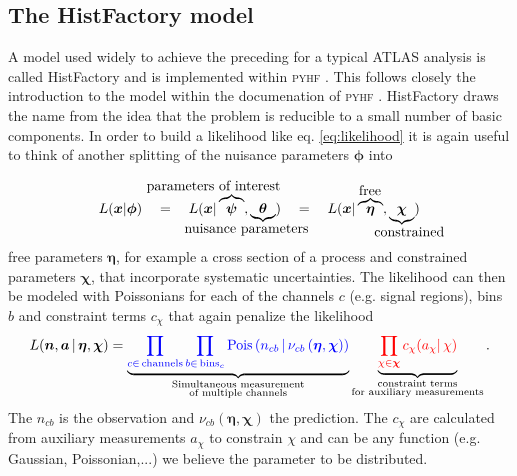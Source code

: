 \subsection{The HistFactory model}

A model used widely to achieve the preceding for a typical ATLAS analysis is called HistFactory \citep{cranmer2012histfactory} and is implemented within \textsc{pyhf} \citep{heinrich2021pyhf}. This follows closely the introduction to the model within the documenation of \textsc{pyhf} \citep{pyhf_intro}. HistFactory draws the name from the idea that the problem is reducible to a small number of basic components. In order to build a likelihood like eq. \ref{eq:likelihood} it is again useful to think of another splitting of the nuisance parameters $\bm{\phi}$ into

\newcommand{\freeset}{\bm{\eta}}
\newcommand{\constrset}{\bm{\chi}}
\newcommand{\singleconstr}{\chi}
\newcommand{\channelcounts}{\bm{n}}
\newcommand{\auxdata}{\bm{a}}
\newcommand{\poiset}{\bm{\psi}}
\newcommand{\nuisset}{\bm{\theta}}
\newcommand{\fullset}{\bm{\phi}}
\newcommand{\singlefull}{\phi}


\begin{equation}
 L(\bm{x}|\fullset) \quad=\quad
 L(\bm{x}|\overbrace{\poiset}^{\llap{\text{parameters of interest}}},\underbrace{\nuisset}_{\llap{\text{nuisance parameters}}}) \quad=\quad
 L(\bm{x}|\overbrace{\freeset}^{\rlap{\text{free}}},\underbrace{\constrset}_{\rlap{\text{constrained}}}) 
\end{equation}
free parameters $\freeset$, for example a cross section of a process and constrained parameters $\constrset$, that incorporate systematic uncertainties. The likelihood can then be modeled with Poissonians for each of the channels $c$ (e.g. signal regions), bins $b$ and constraint terms $c_{\singleconstr}$ that again penalize the likelihood
\begin{equation}
L(\channelcounts, \auxdata \,|\,\freeset,\constrset) = \underbrace{\color{blue}{\prod_{c\in\mathrm{\,channels}} \prod_{b \in \mathrm{\,bins}_c}\textrm{Pois}\left(n_{cb} \,\middle|\, \nu_{cb}\left(\freeset,\constrset\right)\right)}}_{\substack{\text{Simultaneous measurement}\\%
\text{of multiple channels}}} \underbrace{\color{red}{\prod_{\singleconstr \in \constrset} c_{\singleconstr}(a_{\singleconstr} |\, \singleconstr)}}_{\substack{\text{constraint terms}\\%
\text{for }\text{auxiliary measurements}}}.
\end{equation}
The $n_{cb}$ is the observation and $\nu_{cb}(\freeset,\constrset)$ the prediction. The $c_{\singleconstr}$ are calculated from auxiliary measurements $a_{\singleconstr}$ to constrain $\singleconstr$ and can be any function (e.g. Gaussian, Poissonian,...) we believe the parameter to be distributed. 

